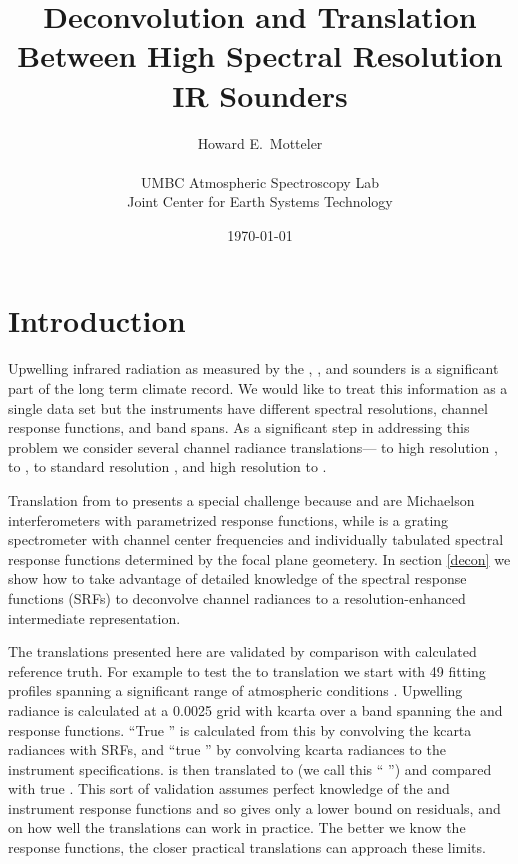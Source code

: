 \documentclass[12pt]{article}
\title{Deconvolution and Translation \\
  Between High Spectral Resolution  \\
  IR Sounders \\
}
\author{Howard E.~Motteler \\
  \\
  UMBC Atmospheric Spectroscopy Lab \\
  Joint Center for Earth Systems Technology \\
}
\date{\today}
\begin{document}
\maketitle

\section{Introduction}

Upwelling infrared radiation as measured by the {\airs}
\cite{airs1}, {\iasi} \cite{iasi1}, and {\cris} \cite{cris1,cris2}
sounders is a significant part of the long term climate record.  We
would like to treat this information as a single data set but the
instruments have different spectral resolutions, channel response
functions, and band spans.  As a significant step in addressing this
problem we consider several channel radiance translations---{\iasi}
to high resolution {\cris}, {\iasi} to {\airs}, {\airs} to standard
resolution {\cris}, and high resolution {\cris} to {\airs}.

Translation from {\airs} to {\cris} presents a special challenge
because {\cris} and {\iasi} are Michaelson interferometers with
parametrized response functions, while {\airs} is a grating
spectrometer with channel center frequencies and individually
tabulated spectral response functions determined by the focal plane
geometery.  In section \ref{decon} we show how to take advantage of
detailed knowledge of the {\airs} spectral response functions (SRFs)
to deconvolve {\airs} channel radiances to a resolution-enhanced
intermediate representation.

The translations presented here are validated by comparison with
calculated reference truth.  For example to test the {\iasi} to
{\airs} translation we start with 49 fitting profiles spanning a
significant range of atmospheric conditions \cite{sarta1,sarta2}.
Upwelling radiance is calculated at a 0.0025 {\wn} grid with kcarta
\cite{kcarta1} over a band spanning the {\airs} and {\iasi} response
functions.  ``True {\airs}'' is calculated from this by convolving
the kcarta radiances with {\airs} SRFs, and ``true {\iasi}'' by
convolving kcarta radiances to the {\iasi} instrument
specifications.  {\iasi} is then translated to {\airs} (we call this
``{\iasi} {\airs}'') and compared with true {\airs}.  This sort of
validation assumes perfect knowledge of the {\airs} and {\iasi}
instrument response functions and so gives only a lower bound on
residuals, and on how well the translations can work in practice.
The better we know the response functions, the closer practical
translations can approach these limits.
\end{document}
